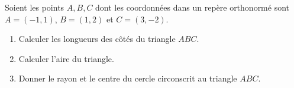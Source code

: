 
\begin{exercice}\label{exoSeconde-0020}

    Soient\cite{BAIljy} les points \( A,B,C\) dont les coordonnées dans un repère orthonormé sont \( A=(-1,1)\), \( B=(1,2)\) et \( C=(3,-2)\).
    \begin{enumerate}
        \item
            Calculer les longueurs des côtés du triangle \( ABC\).
        \item
            Calculer l'aire du triangle.
        \item
            Donner le rayon et le centre du cercle circonscrit au triangle \( ABC\).
    \end{enumerate}

\end{exercice}
